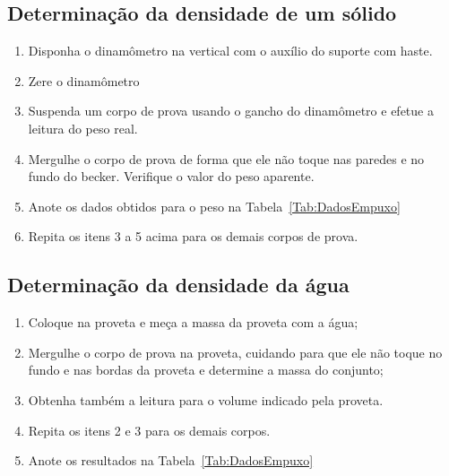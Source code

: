 \subsection{Determinação da densidade de um sólido}
\begin{enumerate}
	\item Disponha o dinamômetro na vertical com o auxílio do suporte com haste.
	\item Zere o dinamômetro
	\item Suspenda um corpo de prova usando o gancho do dinamômetro e efetue a leitura do peso real.
	\item Mergulhe o corpo de prova de forma que ele não toque nas paredes e no fundo do becker. Verifique o valor do peso aparente.
	\item Anote os dados obtidos para o peso na Tabela~\ref{Tab:DadosEmpuxo}
	\item Repita os itens 3 a 5 acima para os demais corpos de prova.
\end{enumerate}

\subsection{Determinação da densidade da água}
\begin{enumerate}
\item Coloque  na proveta e meça a massa da proveta com a água;
\item Mergulhe o corpo de prova na proveta, cuidando para que ele não toque no fundo e nas bordas da proveta e determine a massa do conjunto;
\item Obtenha também a leitura para o volume indicado pela proveta.
\item Repita os itens 2 e 3 para os demais corpos.
\item Anote os resultados na Tabela~\ref{Tab:DadosEmpuxo}
\end{enumerate}

\cleardoublepage

